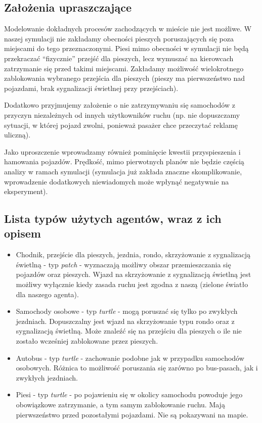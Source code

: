\documentclass{article}
\begin{document}
\subsection{Założenia upraszczające}
\label{subsection:uproszczenia}
Modelowanie dokładnych procesów zachodzących w mieście nie jest możliwe. W naszej symulacji nie zakładamy obecności pieszych poruszających się poza miejscami do tego przeznaczonymi. Piesi mimo obecności w symulacji nie będą przekraczać ``fizycznie'' przejść dla pieszych, lecz wymuszać na kierowcach zatrzymanie się przed takimi miejscami. Zakładamy możliwość wielokrotnego zablokowania wybranego przejścia dla pieszych (pieszy ma pierwszeństwo nad pojazdami, brak sygnalizacji świetlnej przy przejściach).

Dodatkowo przyjmujemy założenie o nie zatrzymywaniu się samochodów z przyczyn niezależnych od innych użytkowników ruchu (np. nie dopuszczamy sytuacji, w której pojazd zwolni, ponieważ pasażer chce przeczytać reklamę uliczną).

Jako uproszczenie wprowadzamy również pominięcie kwestii przyspieszenia i hamowania pojazdów. Prędkość, mimo pierwotnych planów nie będzie częścią analizy w ramach symulacji (symulacja już zakłada znaczne skomplikowanie, wprowadzenie dodatkowych niewiadomych może wpłynąć negatywnie na eksperyment).

\subsection{Lista typów użytych agentów, wraz z ich opisem}
\label{subsection:agenty}
\begin{itemize}
    \item Chodnik, przejście dla pieszych, jezdnia, rondo, skrzyżowanie z sygnalizacją świetlną - typ \textit{patch} - wyznaczają możliwy obszar przemieszczania się pojazdów oraz pieszych. Wjazd na skrzyżowanie z sygnalizacją świetlną jest możliwy wyłącznie kiedy zasada ruchu jest zgodna z naszą (zielone światło dla naszego agenta).
    \item Samochody osobowe - typ \textit{turtle} - mogą poruszać się tylko po zwykłych jezdniach. Dopuszczalny jest wjazd na skrzyżowanie typu rondo oraz z sygnalizacją świetlną. Może znaleźć się na przejściu dla pieszych o ile nie zostało wcześniej zablokowane przez pieszych.
    \item Autobus - typ \textit{turtle} - zachowanie podobne jak w przypadku samochodów osobowych. Różnica to możliwość poruszania się zarówno po bus-pasach, jak i zwykłych jezdniach.
    \item Piesi - typ \textit{turtle} - po pojawieniu się w okolicy samochodu powoduje jego obowiązkowe zatrzymanie, a tym samym zablokowanie ruchu. Mają pierwszeństwo przed pozostałymi pojazdami. Nie są pokazywani na mapie.
\end{itemize}
\end{document}
